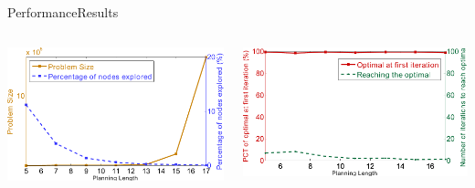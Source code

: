 \begin{frame}{Performance}{Results}

\begin{columns}
\begin{minipage}{\textwidth}
\includegraphics[width=\textwidth]{./figure/T_ProbSize_ExpRatio}
\end{minipage}
\begin{minipage}{\textwidth}
\includegraphics[width=\textwidth]{./figure/T_InitOpt_OptRch}
\end{minipage}
\end{columns}

\end{frame}

